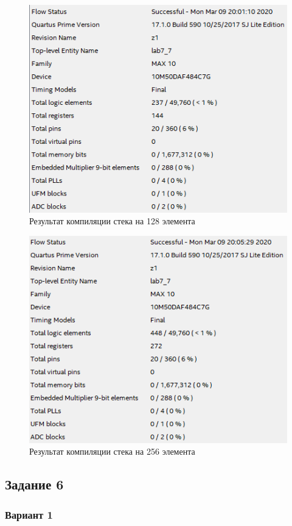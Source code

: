 \documentclass[a4paper,14pt]{article}
\begin{document}
	\begin{figure}[H]
		\centering
		\includegraphics[width=0.8\linewidth]{images/z5_res_128}
		\caption{Результат компиляции стека на 128 элемента}
		\label{fig:z5_res_128}
	\end{figure}
	
	\begin{figure}[H]
		\centering
		\includegraphics[width=0.8\linewidth]{images/z5_res_256}
		\caption{Результат компиляции стека на 256 элемента}
		\label{fig:z5_res_256}
	\end{figure}

	\subsection{Задание 6}

	\subsubsection{Вариант 1}
	
\end{document}
